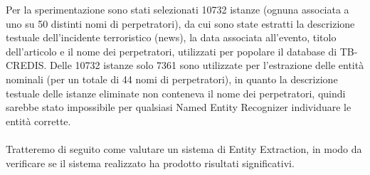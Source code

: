 Per la sperimentazione sono stati selezionati 10732 istanze (ognuna associata a uno su 50 distinti nomi di perpetratori), da cui sono state estratti la descrizione testuale dell'incidente terroristico (news), la data associata all'evento, titolo dell'articolo e il nome dei perpetratori, utilizzati per popolare il database di TB-CREDIS. 
Delle 10732 istanze solo 7361 sono utilizzate per l'estrazione delle entità nominali (per un totale di 44 nomi di perpetratori), in quanto la descrizione testuale delle istanze eliminate non conteneva il nome dei perpetratori, quindi sarebbe stato impossibile per qualsiasi Named Entity Recognizer individuare le entità corrette.

\paragraph{} Tratteremo di seguito come valutare un sistema di Entity Extraction, in modo da verificare se il sistema realizzato ha prodotto risultati significativi. 

